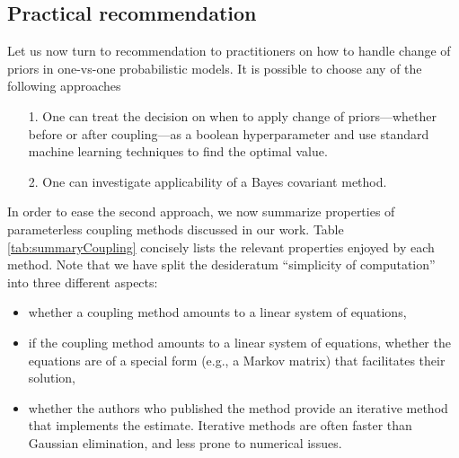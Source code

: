\subsection{Practical recommendation}

Let us now turn to recommendation to practitioners on how to handle change of priors in one-vs-one probabilistic models. It is possible to choose any of the following approaches

\begin{itemize}
\item[1.] One can treat the decision on when to apply change of priors---whether before or after coupling---as a boolean hyperparameter and use standard machine learning techniques to find the optimal value.
\item[2.] One can investigate applicability of a Bayes covariant method. 
\end{itemize}

In order to ease the second approach,   we now summarize properties of parameterless coupling methods discussed in our work.  Table \ref{tab:summaryCoupling} concisely lists the relevant properties enjoyed by each method. Note that we have split the desideratum ``simplicity of computation'' into three different aspects:
\begin{itemize}
	\item whether a coupling method amounts to a linear system of equations,
	\item if the coupling method amounts to a linear system of equations, whether the equations are of a special form (e.g., a Markov matrix) that facilitates their solution,
	\item whether the authors who published the method provide an iterative method that implements the estimate. Iterative methods are often  faster than Gaussian elimination, and less prone to numerical issues.
\end{itemize}




